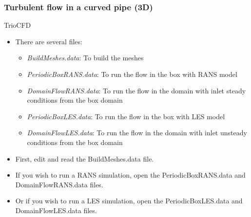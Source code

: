 \documentclass[10pt, hyperref={unicode=true,pdfusetitle, bookmarks=true,bookmarksnumbered=false,bookmarksopen=false, breaklinks=false,pdfborder={0 0l 1},backref=true,colorlinks=true,linkcolor=darkblue,pageanchor}]{beamer}
\begin{document}
\begin{frame}
\frametitle{Turbulent flow in a curved pipe (3D)}
\begin{block}{TrioCFD}

\begin{itemize}
\item There are several files:\\
    \begin{itemize}
    \item [$\circ$] \textit{BuildMeshes.data}: To build the meshes\\
    \item [$\circ$] \textit{PeriodicBoxRANS.data}: To run the flow in the box with RANS model\\
    \item [$\circ$] \textit{DomainFlowRANS.data}: To run the flow in the domain with inlet steady conditions from the box domain\\
    \item [$\circ$] \textit{PeriodicBoxLES.data}: To run the flow in the box with LES model\\
    \item [$\circ$] \textit{DomainFlowLES.data}: To run the flow in the domain with inlet unsteady conditions from the box domain
    \end{itemize}

\item First, edit and read the BuildMeshes.data file.

\item If you wish to run a RANS simulation, open the PeriodicBoxRANS.data and DomainFlowRANS.data files.

\item Or if you wish to run a LES simulation, open the PeriodicBoxLES.data and DomainFlowLES.data files.
\end{itemize}

\end{block}
\end{frame}
\end{document}

